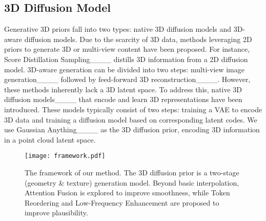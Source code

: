 \vspace{-0.4cm}
\subsection{3D Diffusion Model}

Generative 3D priors fall into two types: native 3D diffusion models and 3D-aware diffusion models. Due to the scarcity of 3D data, methods leveraging 2D priors to generate 3D or multi-view content have been proposed. For instance, Score Distillation Sampling____ distills 3D information from a 2D diffusion model. 3D-aware generation can be divided into two steps: multi-view image generation____ followed by feed-forward 3D reconstruction____. However, these methods inherently lack a 3D latent space. To address this, native 3D diffusion models____ that encode and learn 3D representations have been introduced. These models typically consist of two steps: training a VAE to encode 3D data and training a diffusion model based on corresponding latent codes. We use Gaussian Anything____ as the 3D diffusion prior, encoding 3D information in a point cloud latent space.

\begin{figure*}[t]
    \centering
    \texttt{[image: framework.pdf]}
    \vspace{-0.6cm}
    \caption{The framework of our method. The 3D diffusion prior is a two-stage (geometry \& texture) generation model. Beyond basic interpolation, Attention Fusion  is explored to improve smoothness, while Token Reordering  and Low-Frequency Enhancement are proposed to improve plausibility.}
    \label{fig: framework}
    \vspace{-0.1cm}
\end{figure*}